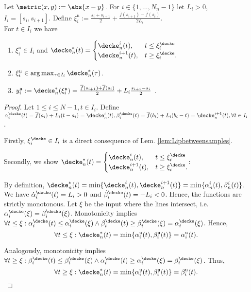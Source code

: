 \begin{lem} \label{lem:ceiling_maxvalues}
Let $\metric(x,y) := \abs{x-y}$. For $i \in \{1,\ldots,N_n-1\}$ let  $L_i > 0$, $I_i = [s_i,s_{i+1}]$.
Define $\xi^{\mathfrak u}_i :=  \frac{s_i+s_{i+1}}{2}+ \frac{\overline f(s_{i+1}) - \overline f(s_i)}{2 L_i}  $.\\
For $t \in I_i$ we have 
\begin{enumerate}
\item $\xi^{\mathfrak u}_i \in I_i$ and  $\decke^*_n(t) = 
 \begin{cases}  
 \decke^i_n (t), & t \leq \xi^\decke_i \\
 \decke^{i+1}_n(t), & t \geq \xi^\decke_i.
 \end{cases}$
\item $\xi^{\mathfrak u}_i \in \arg\max_{\tau \in I_i} \decke^*_n (\tau)$.
\item  $y^{\mathfrak u}_i := \decke_n^*(\xi^{\mathfrak u}_i) = \frac{\overline f(s_{i+1}) +\overline f(s_i)}{2} + L_i \frac{s_{i+1}-s_i}{2}$ .
\end{enumerate}
\begin{proof} Let $1 \leq i \leq N-1, t \in I_i$. Define $\alpha^\decke_i(t) = \overline f(a_i) + L_i (t-a_i) = \decke_n^i(t), \beta^\decke_i (t) = \overline f(b_i) + L_i (b_i - t) = \decke^{i+1}_n(t), \forall t \in I_i$.

Firstly, $\xi^\decke_i \in I_i$ is a direct consequence of Lem. \ref{lem:Lipbetweensamples}.

Secondly, we show $\decke^*_n(t) = 
 \begin{cases}  
 \decke^i_n (t), & t \leq \xi^\decke_i \\
 \decke^{i+1}_n(t), & t \geq \xi^\decke_i.
 \end{cases}$:

By definition,
$\decke^*_n (t) = \min\{ \decke^{i}_n(t), \decke^{i+1}_n(t)\} = \min\{\alpha^i_n (t),\beta^i_n(t)\}$.
We have $\dot  \alpha^\decke_i(t) = L_i > 0$ and $\dot  \beta^\decke_i(t) = - L_i < 0$. Hence, the functions are strictly monotonous. Let $\xi$ be the input where the lines intersect, i.e. $\alpha^\decke_i(\xi) = \beta^\decke_i(\xi)$. Monotonicity implies $\forall t \leq \xi : \alpha^\decke_i(t) \leq \alpha^\decke_i(\xi) \wedge \beta^\decke_i(t) \geq \beta^\decke_i(\xi) = \alpha^\decke_i(\xi)$. 
Hence,
 \[\forall t \leq \xi: \decke^*_n(t) = \min \{\alpha_i^{\mathfrak u} (t), \beta_i^{\mathfrak u} (t) \}= \alpha_i^{\mathfrak u} (t).\] 
 
Analogously, monotonicity implies $\forall t \geq \xi : \beta^\decke_i(t) \leq \beta^\decke_i(\xi) \wedge \alpha^\decke_i(t) \geq \alpha^\decke_i(\xi) = \beta^\decke_i(\xi)$. 
Thus,
 \[\forall t \geq \xi: \decke^*_n(t) = \min \{\alpha_i^{\mathfrak u} (t), \beta_i^{\mathfrak u} (t) \}= \beta_i^{\mathfrak u} (t).\] 


\end{proof}
\end{lem}
